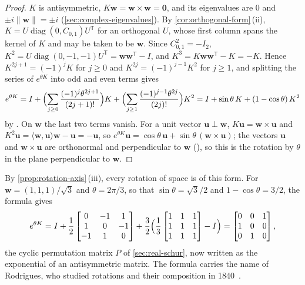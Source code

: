 \begin{proof}
$K$ is antisymmetric, $K\mathbf w=\mathbf w\times\mathbf w=\mathbf 0$, and its eigenvalues are $0$ and $\pm i\|\mathbf w\|=\pm i$ (\cref{sec:complex-eigenvalues}). By \cref{cor:orthogonal-form}\,(ii), $K=U\operatorname{diag}(0,C_{0,1})U^{\mathsf T}$ for an orthogonal $U$, whose first column spans the kernel of $K$ and may be taken to be $\mathbf w$. Since $C_{0,1}^2=-I_2$, $K^2=U\operatorname{diag}(0,-1,-1)U^{\mathsf T}=\mathbf w\mathbf w^{\mathsf T}-I$, and $K^3=K\mathbf w\mathbf w^{\mathsf T}-K=-K$. Hence $K^{2j+1}=(-1)^jK$ for $j\ge0$ and $K^{2j}=(-1)^{j-1}K^2$ for $j\ge1$, and splitting the series of $e^{\theta K}$ into odd and even terms gives
\[
e^{\theta K}=I+\Bigl(\sum_{j\ge0}\frac{(-1)^j\theta^{2j+1}}{(2j+1)!}\Bigr)K+\Bigl(\sum_{j\ge1}\frac{(-1)^{j-1}\theta^{2j}}{(2j)!}\Bigr)K^2=I+\sin\theta\,K+(1-\cos\theta)\,K^2
\]
by . On $\mathbf w$ the last two terms vanish. For a unit vector $\mathbf u\perp\mathbf w$, $K\mathbf u=\mathbf w\times\mathbf u$ and $K^2\mathbf u=\langle\mathbf w,\mathbf u\rangle\mathbf w-\mathbf u=-\mathbf u$, so $e^{\theta K}\mathbf u=\cos\theta\,\mathbf u+\sin\theta\,(\mathbf w\times\mathbf u)$; the vectors $\mathbf u$ and $\mathbf w\times\mathbf u$ are orthonormal and perpendicular to $\mathbf w$ (), so this is the rotation by $\theta$ in the plane perpendicular to $\mathbf w$.
\end{proof}

By \cref{prop:rotation-axis}\,(iii), every rotation of space is of this form. For $\mathbf w=(1,1,1)/\sqrt3$ and $\theta=2\pi/3$, so that $\sin\theta=\sqrt3/2$ and $1-\cos\theta=3/2$, the formula gives
\[
e^{\theta K}=I+\frac12\begin{bmatrix}0&-1&1\\1&0&-1\\-1&1&0\end{bmatrix}+\frac32\Bigl(\frac13\begin{bmatrix}1&1&1\\1&1&1\\1&1&1\end{bmatrix}-I\Bigr)=\begin{bmatrix}0&0&1\\1&0&0\\0&1&0\end{bmatrix},
\]
the cyclic permutation matrix $P$ of \cref{sec:real-schur}, now written as the exponential of an antisymmetric matrix. The formula carries the name of Rodrigues, who studied rotations and their composition in 1840~\cite{rodrigues1840}.


